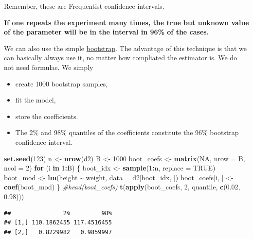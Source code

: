 \documentclass[
]{book}
\newenvironment{Shaded}{\begin{snugshade}}{\end{snugshade}}
\newcommand{\AttributeTok}[1]{\textcolor[rgb]{0.13,0.29,0.53}{#1}}
\newcommand{\CommentTok}[1]{\textcolor[rgb]{0.56,0.35,0.01}{\textit{#1}}}
\newcommand{\ConstantTok}[1]{\textcolor[rgb]{0.56,0.35,0.01}{#1}}
\newcommand{\ControlFlowTok}[1]{\textcolor[rgb]{0.13,0.29,0.53}{\textbf{#1}}}
\newcommand{\DecValTok}[1]{\textcolor[rgb]{0.00,0.00,0.81}{#1}}
\newcommand{\FloatTok}[1]{\textcolor[rgb]{0.00,0.00,0.81}{#1}}
\newcommand{\FunctionTok}[1]{\textcolor[rgb]{0.13,0.29,0.53}{\textbf{#1}}}
\newcommand{\NormalTok}[1]{#1}
\newcommand{\OtherTok}[1]{\textcolor[rgb]{0.56,0.35,0.01}{#1}}
\newcommand{\SpecialCharTok}[1]{\textcolor[rgb]{0.81,0.36,0.00}{\textbf{#1}}}
\providecommand{\tightlist}{%
  \setlength{\itemsep}{0pt}\setlength{\parskip}{0pt}}
\begin{document}
Remember, these are Frequentist confidence intervals.

\textbf{If one repeats the experiment
many times, the true but unknown value of the parameter will
be in the interval in 96\% of the cases.}

We can also use the simple \href{https://en.wikipedia.org/wiki/Bootstrapping_(statistics)}{bootstrap}.
The advantage of this technique is that we can basically always use it,
no matter how compliated the estimator is. We do not need formulae.
We simply

\begin{itemize}
\tightlist
\item
  create 1000 bootstrap samples,
\item
  fit the model,
\item
  store the coefficients.
\item
  The 2\% and 98\% quantiles of the coefficients constitute the 96\% bootstrap confidence interval.
\end{itemize}

\begin{Shaded}
\begin{Highlighting}[]
\FunctionTok{set.seed}\NormalTok{(}\DecValTok{123}\NormalTok{)}
\NormalTok{n }\OtherTok{\textless{}{-}} \FunctionTok{nrow}\NormalTok{(d2)}
\NormalTok{B }\OtherTok{\textless{}{-}} \DecValTok{1000}
\NormalTok{boot\_coefs }\OtherTok{\textless{}{-}} \FunctionTok{matrix}\NormalTok{(}\ConstantTok{NA}\NormalTok{, }\AttributeTok{nrow =}\NormalTok{ B, }\AttributeTok{ncol =} \DecValTok{2}\NormalTok{)}
\ControlFlowTok{for}\NormalTok{ (i }\ControlFlowTok{in} \DecValTok{1}\SpecialCharTok{:}\NormalTok{B) \{}
\NormalTok{  boot\_idx }\OtherTok{\textless{}{-}} \FunctionTok{sample}\NormalTok{(}\DecValTok{1}\SpecialCharTok{:}\NormalTok{n, }\AttributeTok{replace =} \ConstantTok{TRUE}\NormalTok{)}
\NormalTok{  boot\_mod }\OtherTok{\textless{}{-}} \FunctionTok{lm}\NormalTok{(height }\SpecialCharTok{\textasciitilde{}}\NormalTok{ weight, }\AttributeTok{data =}\NormalTok{ d2[boot\_idx, ])}
\NormalTok{  boot\_coefs[i, ] }\OtherTok{\textless{}{-}} \FunctionTok{coef}\NormalTok{(boot\_mod)}
\NormalTok{\}}
\CommentTok{\#head(boot\_coefs)}
\FunctionTok{t}\NormalTok{(}\FunctionTok{apply}\NormalTok{(boot\_coefs, }\DecValTok{2}\NormalTok{, quantile, }\FunctionTok{c}\NormalTok{(}\FloatTok{0.02}\NormalTok{, }\FloatTok{0.98}\NormalTok{)))}
\end{Highlighting}
\end{Shaded}

\begin{verbatim}
##               2%         98%
## [1,] 110.1862455 117.4516455
## [2,]   0.8229982   0.9859997
\end{verbatim}
\end{document}
